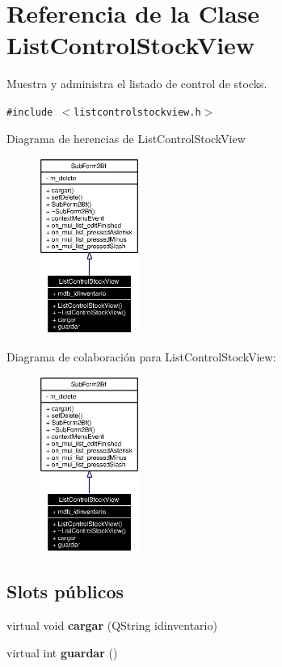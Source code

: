 \section{Referencia de la Clase List\-Control\-Stock\-View}
\label{classListControlStockView}
Muestra y administra el listado de control de stocks.  


{\tt \#include $<$listcontrolstockview.h$>$}

Diagrama de herencias de List\-Control\-Stock\-View\begin{figure}[H]
\begin{center}
\leavevmode
\includegraphics[width=94pt]{classListControlStockView__inherit__graph}
\end{center}
\end{figure}
Diagrama de colaboraci\'{o}n para List\-Control\-Stock\-View:\begin{figure}[H]
\begin{center}
\leavevmode
\includegraphics[width=94pt]{classListControlStockView__coll__graph}
\end{center}
\end{figure}
\subsection*{Slots p\'{u}blicos}
\begin{CompactItemize}
\item 
virtual void {\bf cargar} (QString idinventario)\label{classListControlStockView_i0}

\item 
virtual int {\bf guardar} ()\label{classListControlStockView_i1}

\end{CompactItemize}
